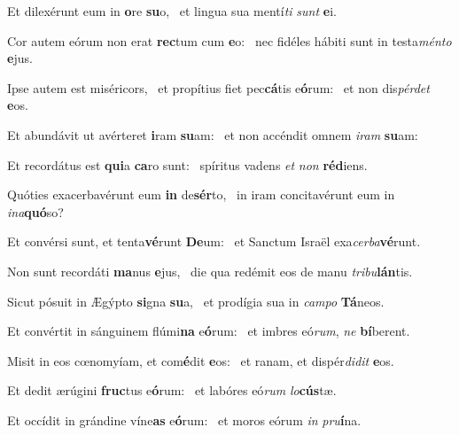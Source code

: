 \item Et dilexérunt eum in \textbf{o}re \textbf{su}o,~\psstar{} et lingua sua mentí\textit{ti} \textit{sunt} \textbf{e}i.

\item Cor autem eórum non erat \textbf{rec}tum cum \textbf{e}o:~\psstar{} nec fidéles hábiti sunt in testa\textit{ménto} \textbf{e}jus.

\item Ipse autem est miséricors,~\pscross{} et propítius fiet pec\textbf{cá}tis e\textbf{ó}rum:~\psstar{} et non dis\textit{pérdet} \textbf{e}os.

\item Et abundávit ut avérteret \textbf{i}ram \textbf{su}am:~\psstar{} et non accéndit omnem \textit{iram} \textbf{su}am:

\item Et recordátus est \textbf{qui}a \textbf{ca}ro sunt:~\psstar{} spíritus vadens \textit{et} \textit{non} \textbf{réd}iens.

\item Quóties exacerbavérunt eum \textbf{in} de\textbf{sér}to,~\psstar{} in iram concitavérunt eum in \textit{ina}\textbf{quó}so?

\item Et convérsi sunt, et tenta\textbf{vé}runt \textbf{De}um:~\psstar{} et Sanctum Israël exa\textit{cerba}\textbf{vé}runt.

\item Non sunt recordáti \textbf{ma}nus \textbf{e}jus,~\psstar{} die qua redémit eos de manu \textit{tribu}\textbf{lán}tis.

\item Sicut pósuit in Ægýpto \textbf{si}gna \textbf{su}a,~\psstar{} et prodígia sua in \textit{campo} \textbf{Tá}neos.

\item Et convértit in sánguinem flúmi\textbf{na} e\textbf{ó}rum:~\psstar{} et imbres eó\textit{rum}, \textit{ne} \textbf{bí}berent.

\item Misit in eos cœnomyíam, et com\textbf{é}dit \textbf{e}os:~\psstar{} et ranam, et dispér\textit{didit} \textbf{e}os.

\item Et dedit ærúgini \textbf{fruc}tus e\textbf{ó}rum:~\psstar{} et labóres eó\textit{rum} \textit{lo}\textbf{cús}tæ.

\item Et occídit in grándine víne\textbf{as} e\textbf{ó}rum:~\psstar{} et moros eórum \textit{in} \textit{pru}\textbf{í}na.

